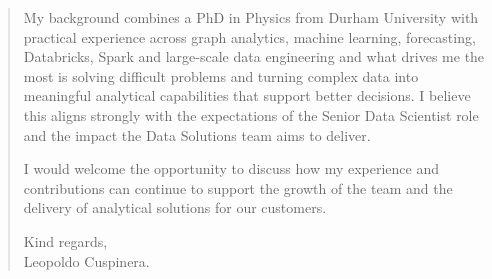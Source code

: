 \documentclass[letterpaper,11pt]{article}
\begin{document}
{\begin{quote}
My background combines a PhD in Physics from Durham University with practical experience across graph analytics, machine learning, forecasting, Databricks, Spark and large-scale data engineering and what drives me the most is solving difficult problems and turning complex data into meaningful analytical capabilities that support better decisions. I believe this aligns strongly with the expectations of the Senior Data Scientist role and the impact the Data Solutions team aims to deliver.

I would welcome the opportunity to discuss how my experience and contributions can continue to support the growth of the team and the delivery of analytical solutions for our customers.

\begin{FlushRight}
Kind regards,\\
Leopoldo Cuspinera.
\end{FlushRight}


\end{quote}
}
% 


% 

\end{document}
